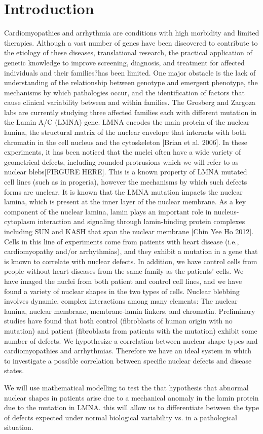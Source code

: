 \section{Introduction}
Cardiomyopathies and arrhythmia are conditions with high morbidity and limited therapies. Although a vast number of genes have been discovered to contribute to the etiology of these diseases, translational research, the practical application of genetic knowledge to improve screening, diagnosis, and treatment for affected individuals and their families?has been limited. One major obstacle is the lack of understanding of the relationship between genotype and emergent phenotype, the mechanisms by which pathologies occur, and the identification of factors that cause clinical variability between and within families. The Grosberg and Zargoza labs are currently studying three affected families each with different mutation in the Lamin A/C (LMNA) gene.  LMNA encodes the main protein of the nuclear lamina, the structural matrix of the nuclear envelope that interacts with both chromatin in the cell nucleus and the cytoskeleton [Brian et al. 2006]. In these experiments, it has been noticed that the nuclei often have a wide variety of geometrical defects, including rounded protrusions which we will refer to as nuclear blebs[FIRGURE HERE]. This is a known property of LMNA mutated cell lines (such as in progeria), however the mechanisms by which such defects forms are unclear. It is known that the LMNA mutation impacts the nuclear lamina, which is present at the inner layer of the nuclear membrane. As a key component of the nuclear lamina, lamin plays an important role in nucleus-cytoplasm interaction and signaling through lamin-binding protein complexes including SUN and KASH that span the nuclear membrane [Chin Yee Ho 2012]. Cells in this line of experiments come from patients with heart disease (i.e., cardiomyopathy and/or arrhythmias), and they exhibit a mutation in a gene that is known to correlate with nuclear defects. In addition, we have control cells from people without heart diseases from the same family as the patients' cells.  We have imaged the nuclei from both patient and control cell lines, and we have found a variety of nuclear shapes in the two types of cells. Nuclear blebbing involves dynamic, complex interactions among many elements: The nuclear lamina, nuclear membrane, membrane-lamin linkers, and chromatin. Preliminary studies have found that both control (fibroblasts of human origin with no mutation) and patient (fibroblasts from patients with the mutation) exhibit some number of defects. We hypothesize a correlation between nuclear shape types and cardiomyopathies and arrhythmias. Therefore we have an ideal system in which to investigate a possible correlation between specific nuclear defects and disease states.

We will use mathematical modelling to test the that hypothesis that abnormal nuclear shapes in patients arise due to a mechanical anomaly in the lamin protein due to the mutation in LMNA. this will allow us to differentiate between the type of defects expected under normal biological variability vs. in a pathological situation. 